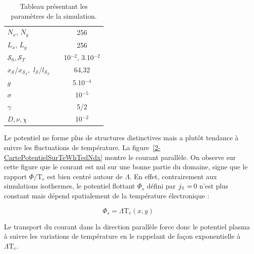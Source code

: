 \begin{refsection}
\begin{table}[!htbp]
\begin{tabular}{@{}lcc@{}}
$N_x$, $N_y$ && 256\\
$L_x$, $L_y$ && 256\\
$\mathcal{S}_0,\mathcal{S}_T$ && 10$^{-2}$, 3.10$^{-2}$\\
$x_\mathcal{S}$/$x_{\mathcal{S}_T}$,~$l_\mathcal{S}$/$l_{\mathcal{S}_T}$ &&
64,32\\
$g$ && 5.10$^{-4}$\\
$\sigma$ && 10$^{-5}$\\
$\gamma$ && 5/2\\
$D,\nu, \chi$ && 10$^{-2}$\\
\bottomrule
\end{tabular}
\caption{Tableau présentant les paramètres de la
simulation.}\label{2-TokTempParam}
\end{table}


	
Le potentiel ne forme plus de structures
distinctives mais a 
plutôt tendance à suivre les fluctuations de température. La
figure~\ref{2-CartePotentielSurTeWhTedNdx} montre le courant parallèle. On
observe sur cette figure que le courant est nul sur une bonne partie du
domaine, signe que le rapport $\Phi/\text{T}_e$ est bien centré autour de
$\Lambda$. En effet,
contrairement aux simulations isothermes, le potentiel flottant $\Phi_s$ défini
par $j_\para=\,$0 n'est plus constant mais dépend spatialement de la
température électronique :

\begin{equation}
	\Phi_{s}=\Lambda\text{T}_e(x,y)
\end{equation}

Le transport du courant dans la direction
parallèle force donc le potentiel plasma à suivre les variations de température
en le rappelant de façon exponentielle à $\Lambda\text{T}_e$. 


\end{refsection}

